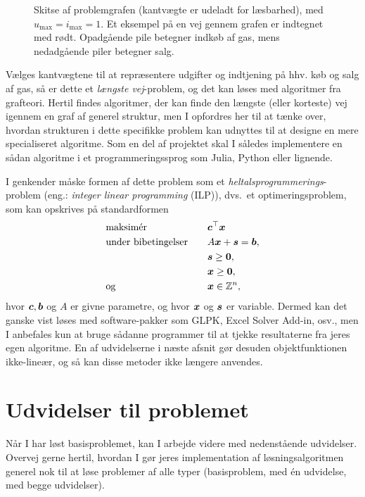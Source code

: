 \documentclass[12pt,a4paper,oneside,final]{article}
\begin{document}
\begin{figure}[htbp]
  \centering
  
  \captionsetup{width=0.75\textwidth}
  \caption{
    \small
    Skitse af problemgrafen (kantvægte er udeladt for læsbarhed), med \(u_{\max} = i_{\max} = 1\).
    Et eksempel på en vej gennem grafen er indtegnet med rødt.
    Opadgående pile betegner indkøb af gas, mens nedadgående piler betegner salg.
  }
  \label{fig:graph}
\end{figure}

Vælges kantvægtene til at repræsentere udgifter og indtjening på hhv. køb og salg af gas, så er dette et \emph{længste vej}-problem, og det kan løses med algoritmer fra grafteori.
Hertil findes algoritmer, der kan finde den længste (eller korteste) vej igennem en graf af generel struktur, men I opfordres her til at tænke over, hvordan strukturen i dette specifikke problem kan udnyttes til at designe en mere specialiseret algoritme.
Som en del af projektet skal I således implementere en sådan algoritme i et programmeringssprog som Julia, Python eller lignende.

I genkender måske formen af dette problem som et \emph{heltalsprogrammerings}-problem (eng.: \emph{integer linear programming} (ILP)), dvs.\ et optimeringsproblem, som kan opskrives på standardformen
\begin{alignat*}{2}
 & \text{maksimér}            &\quad  & \bm{c}^{\top} \bm{x}  \\
 & \text{under bibetingelser} &\quad  & A \bm{x} + \bm{s} = \bm{b} , \\
 &                            &\quad  & \bm{s} \geq \bm{0} , \\
 &                            &\quad  & \bm{x} \geq \bm{0} , \\
 & \text{og}                  &\quad  & \bm{x} \in \mathbb{Z}^{n} ,
\end{alignat*}
hvor \(\bm{c},\bm{b}\) og \(A\) er givne parametre, og hvor \(\bm{x}\) og \(\bm{s}\) er variable.
Dermed kan det ganske vist løses med software-pakker som GLPK, Excel Solver Add-in, osv., men I anbefales kun at bruge sådanne programmer til at tjekke resultaterne fra jeres egen algoritme.
En af udvidelserne i næste afsnit gør desuden objektfunktionen ikke-lineær, og så kan disse metoder ikke længere anvendes.


\clearpage
\section{Udvidelser til problemet}
Når I har løst basisproblemet, kan I arbejde videre med nedenstående udvidelser.
Overvej gerne hertil, hvordan I gør jeres implementation af løsningsalgoritmen generel nok til at løse problemer af alle typer (basisproblem, med én udvidelse, med begge udvidelser).
\end{document}
